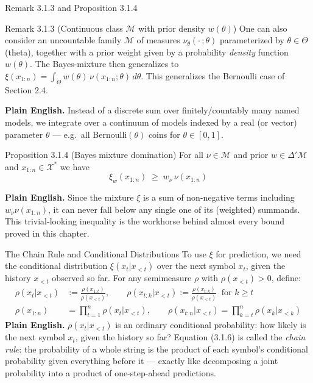 \documentclass[aspectratio=169,10pt]{beamer}
\newcommand{\X}{\mathcal{X}}
\newcommand{\Mcal}{\mathcal{M}}
\begin{document}
\begin{frame}{Remark 3.1.3 and Proposition 3.1.4}
  \begin{block}{Remark 3.1.3 (Continuous class $\Mcal$ with prior density $w(\theta)$)}
    One can also consider an uncountable family $\Mcal$ of measures
    $\nu_\theta(\cdot\,;\theta)$ parameterized by $\theta \in \Theta$ (theta),
    together with a prior weight given by a probability \emph{density}
    function $w(\theta)$. The Bayes-mixture then generalizes to
    $\xi(x_{1:n}) = \int_\Theta w(\theta)\,\nu(x_{1:n};\theta)\,d\theta$. This
    generalizes the Bernoulli case of Section 2.4.
  \end{block}
  \textbf{Plain English.} Instead of a discrete sum over finitely/countably
  many named models, we integrate over a continuum of models indexed by a
  real (or vector) parameter $\theta$ --- e.g.\ all Bernoulli$(\theta)$ coins
  for $\theta \in [0,1]$.

  \begin{block}{Proposition 3.1.4 (Bayes mixture domination)}
    For all $\nu \in \Mcal$ and prior $w \in \Delta'\Mcal$ and
    $x_{1:n} \in \X^{*}$ we have
    \[
      \xi_w(x_{1:n}) \; \geq \; w_\nu\, \nu(x_{1:n})
    \]
  \end{block}
  \textbf{Plain English.} Since the mixture $\xi$ is a sum of non-negative
  terms including $w_\nu \nu(x_{1:n})$, it can never fall below any single one
  of its (weighted) summands. This trivial-looking inequality is the
  workhorse behind almost every bound proved in this chapter.
\end{frame}

\begin{frame}{The Chain Rule and Conditional Distributions}
  To use $\xi$ for prediction, we need the conditional distribution
  $\xi(x_t|x_{<t})$ over the next symbol $x_t$, given the history $x_{<t}$
  observed so far. For any semimeasure $\rho$ with $\rho(x_{<t})>0$, define:
  \begin{align}
    \rho(x_t|x_{<t}) &:= \frac{\rho(x_{1:t})}{\rho(x_{<t})}, \qquad
    \rho(x_{t:k}|x_{<t}) := \frac{\rho(x_{t:k})}{\rho(x_{<t})} \ \text{ for } k\ge t
    \tag{3.1.5}\\
    \rho(x_{1:n}) &= \prod_{t=1}^{n}\rho(x_t|x_{<t}), \qquad
    \rho(x_{t:n}|x_{<t}) = \prod_{k=t}^{n}\rho(x_k|x_{<k}) \tag{3.1.6}
  \end{align}
  \textbf{Plain English.} $\rho(x_t|x_{<t})$ is an ordinary conditional
  probability: how likely is the next symbol $x_t$, given the history so far?
  Equation (3.1.6) is called the \emph{chain rule}: the probability of a whole
  string is the product of each symbol's conditional probability given
  everything before it --- exactly like decomposing a joint probability into a
  product of one-step-ahead predictions.
\end{frame}
\end{document}

